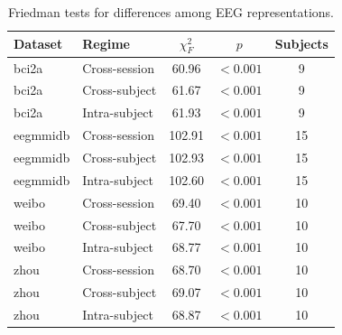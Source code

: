 \begin{table}[t]
\centering
\small
\caption{Friedman tests for differences among EEG representations.}
\label{tab:friedman_tests}
\begin{tabular}{llccc}
\toprule
\textbf{Dataset} & \textbf{Regime} & \textbf{$\chi^2_F$} & \textbf{$p$} & \textbf{Subjects} \\
\midrule
bci2a & Cross-session & 60.96 & $<0.001$ & 9 \\
bci2a & Cross-subject & 61.67 & $<0.001$ & 9 \\
bci2a & Intra-subject & 61.93 & $<0.001$ & 9 \\
eegmmidb & Cross-session & 102.91 & $<0.001$ & 15 \\
eegmmidb & Cross-subject & 102.93 & $<0.001$ & 15 \\
eegmmidb & Intra-subject & 102.60 & $<0.001$ & 15 \\
weibo & Cross-session & 69.40 & $<0.001$ & 10 \\
weibo & Cross-subject & 67.70 & $<0.001$ & 10 \\
weibo & Intra-subject & 68.77 & $<0.001$ & 10 \\
zhou & Cross-session & 68.70 & $<0.001$ & 10 \\
zhou & Cross-subject & 69.07 & $<0.001$ & 10 \\
zhou & Intra-subject & 68.87 & $<0.001$ & 10 \\
\bottomrule
\end{tabular}
\end{table}